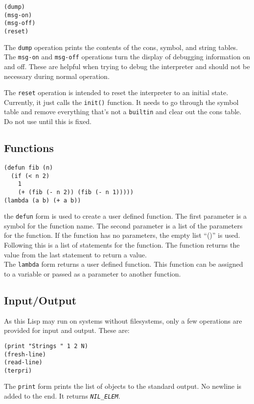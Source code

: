 \documentclass[10pt, openany]{book}
\newcommand{\function}[1]{\texttt{#1}}
\newcommand{\constant}[1]{\emph{\texttt{#1}}}
\begin{document}
\begin{lstlisting}
(dump)
(msg-on)
(msg-off)
(reset)
\end{lstlisting}

The \function{dump} operation prints the contents of the cons, symbol, and string tables.  The \function{msg-on} and \function{msg-off} operations turn the display of debugging information on and off.  These are helpful when trying to debug the interpreter and should not be necessary during normal operation.

The \function{reset} operation is intended to reset the interpreter to an initial state.  Currently, it just calls the \function{init()} function.  It needs to go through the symbol table and remove everything that's not a \function{builtin} and clear out the cons table.  Do not use until this is fixed.

\subsection{Functions}
\begin{lstlisting}
(defun fib (n)
  (if (< n 2)
    1
    (+ (fib (- n 2)) (fib (- n 1)))))
(lambda (a b) (+ a b))
\end{lstlisting}

the \function{defun} form is used to create a user defined function.  The first parameter is a symbol for the function name.  The second parameter is a list of the parameters for the function.  If the function has no parameters, the empty list ``()'' is used.  Following this is a list of statements for the function.  The function returns the value from the last statement to return a value.\\

The \function{lambda} form returns a user defined function.  This function can be assigned to a variable or passed as a parameter to another function.

\subsection{Input/Output}
As this Lisp may run on systems without filesystems, only a few operations are provided for input and output.  These are:

\begin{lstlisting}
(print "Strings " 1 2 N)
(fresh-line)
(read-line)
(terpri)
\end{lstlisting}

The \function{print} form prints the list of objects to the standard output.  No newline is added to the end.  It returns \constant{NIL\_ELEM}.
\end{document}
